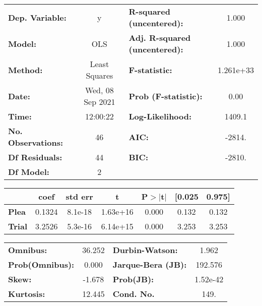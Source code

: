 \begin{center}
\begin{tabular}{lclc}
\toprule
\textbf{Dep. Variable:}    &        y         & \textbf{  R-squared (uncentered):}      &     1.000   \\
\textbf{Model:}            &       OLS        & \textbf{  Adj. R-squared (uncentered):} &     1.000   \\
\textbf{Method:}           &  Least Squares   & \textbf{  F-statistic:       }          & 1.261e+33   \\
\textbf{Date:}             & Wed, 08 Sep 2021 & \textbf{  Prob (F-statistic):}          &     0.00    \\
\textbf{Time:}             &     12:00:22     & \textbf{  Log-Likelihood:    }          &    1409.1   \\
\textbf{No. Observations:} &          46      & \textbf{  AIC:               }          &    -2814.   \\
\textbf{Df Residuals:}     &          44      & \textbf{  BIC:               }          &    -2810.   \\
\textbf{Df Model:}         &           2      & \textbf{                     }          &             \\
\bottomrule
\end{tabular}
\begin{tabular}{lcccccc}
               & \textbf{coef} & \textbf{std err} & \textbf{t} & \textbf{P$> |$t$|$} & \textbf{[0.025} & \textbf{0.975]}  \\
\midrule
\textbf{Plea}  &       0.1324  &      8.1e-18     &  1.63e+16  &         0.000        &        0.132    &        0.132     \\
\textbf{Trial} &       3.2526  &      5.3e-16     &  6.14e+15  &         0.000        &        3.253    &        3.253     \\
\bottomrule
\end{tabular}
\begin{tabular}{lclc}
\textbf{Omnibus:}       & 36.252 & \textbf{  Durbin-Watson:     } &    1.962  \\
\textbf{Prob(Omnibus):} &  0.000 & \textbf{  Jarque-Bera (JB):  } &  192.576  \\
\textbf{Skew:}          & -1.678 & \textbf{  Prob(JB):          } & 1.52e-42  \\
\textbf{Kurtosis:}      & 12.445 & \textbf{  Cond. No.          } &     149.  \\
\bottomrule
\end{tabular}
\end{center}

